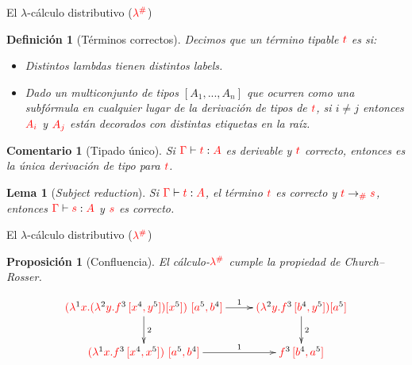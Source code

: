 \documentclass{beamer}
\newtheorem{defes}{Definición}
\newtheorem{lemes}{Lema}
\newtheorem{proes}{Proposición}
\newtheorem{comes}{Comentario}
\newcommand{\cDist}[1]{{\color{red} #1}}
\newcommand{\clambdadist}{\cDist{\lambdadist}}
\newcommand{\cLab}[1]{{\color{black} #1}}
\begin{document}
\begin{frame}{El $\lambda$-cálculo distributivo ($\clambdadist$)}
\begin{defes}[Términos correctos]
Decimos que un término tipable $\cDist{t}$ es  si:
\begin{itemize}
\item Distintos lambdas tienen distintos labels.
\item Dado un multiconjunto de tipos $[A_1, ..., A_n]$ que ocurren como una subfórmula
en cualquier lugar de la derivación de tipos de $\cDist{t}$, si $i\neq j$ entonces
$\cDist{A_i}$ y $\cDist{A_j}$ están decorados con distintas etiquetas en la raíz.
\end{itemize}
\end{defes}

\begin{comes}[Tipado único]
Si $\cDist{\tctx} \vdash \cDist{t} : \cDist{A}$ es derivable y $\cDist{t}$ correcto,
entonces es la única derivación de tipo para $\cDist{t}$.
\end{comes}

\begin{lemes}[\emph{Subject reduction}]
Si $\cDist{\tctx} \vdash \cDist{t} : \cDist{A}$, el término $\cDist{t}$
es correcto y $\cDist{t} \to_{\cDist{\dist}} \cDist{s}$,
entonces $\cDist{\tctx} \vdash \cDist{s} : \cDist{A}$ y $\cDist{s}$ es correcto.
\end{lemes}
\end{frame}


\begin{frame}{El $\lambda$-cálculo distributivo ($\clambdadist$)}
\begin{proes}[Confluencia]
El cálculo-$\clambdadist$ cumple la propiedad de Church--Rosser.
\end{proes}
\[
\xymatrix{
  \cDist{(\lamp{\cLab1}{x}{(\lamp{\cLab2}{y}{f^{\cLab3}\,[x^{\cLab4}, y^{\cLab5}]}) [x^{\cLab5}]})\ [a^{\cLab5}, b^{\cLab4}]} \ar^-{2}[d] \ar^-{1}[r] & \cDist{(\lamp{\cLab2}{y}{f^{\cLab3}\,[b^{\cLab4}, y^{\cLab5}]}) [a^{\cLab5}]} \ar^-{2}[d] \\
  \cDist{(\lamp{\cLab1}{x}{f^{\cLab3}\,[x^{\cLab4}, x^{\cLab5}]})\ [a^{\cLab5}, b^{\cLab4}]} \ar^-{1}[r] & \cDist{f^{\cLab3}\,[b^{\cLab4}, a^{\cLab5}]}\\
}
\]
\end{frame}
\end{document}
